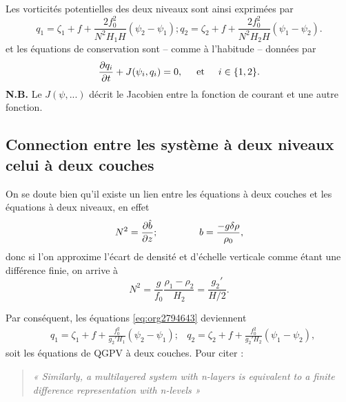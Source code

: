 \documentclass[10pt]{report}
\numberwithin{equation}{section}
\begin{document}
Les vorticités potentielles des deux niveaux sont ainsi exprimées par
\begin{subequations}
\label{eq:org2794643}
\begin{equation}
q_1 = \zeta_1 + f + \frac{2 f_0^2}{N^2 H_1 H} (\psi_2 - \psi_1);
\end{equation}
\begin{equation}
q_2 = \zeta_2 + f + \frac{2 f_0^2}{N^2 H_2 H} (\psi_1 - \psi_2).
\end{equation}
\end{subequations}
et les équations de conservation sont -- comme à l'habitude -- données par
\begin{equation}
\pdv{q_i}{t} + J (\psi_i,q_i) = 0,
\hspace{0.5cm} \text{et} \hspace{0.5cm}
i \in \qty{1,2}.
\end{equation}
\textbf{N.B.} Le \(J(\psi,...)\) décrit le Jacobien entre la fonction de courant et une autre fonction.
\vspace{2cm}

\subsection{Connection entre les système à \textbf{deux niveaux} celui à \textbf{deux couches}}
\label{sec:org340630e}
On se doute bien qu'il existe un lien entre les équations à deux couches et les équations à deux niveaux, en effet
\begin{equation}  
N^2 = \pdv{\hat{b}}{z}; \hspace{1.5cm} b = \frac{-g\delta \rho}{\rho_0},
\end{equation}
donc si l'on approxime l'écart de densité et d'échelle verticale comme étant une différence finie, on arrive à
\begin{equation}
N^2 = \frac{g}{f_0} \frac{\rho_1 - \rho_2}{H_2} = \frac{g_2'}{H/2}.
\end{equation}

Par conséquent, les équations \ref{eq:org2794643} deviennent
\begin{align}
&q_1 = \zeta_1 + f + \frac{f_0^2}{g_2' H_1} (\psi_2 - \psi_1);
&q_2 = \zeta_2 + f + \frac{f_0^2}{g_2' H_2} (\psi_1 - \psi_2),
\end{align}
soit les équations de QGPV à deux couches.
Pour citer \autocite[p.195]{vallis_2006} :
\begin{quote}
\textit{« Similarly, a multilayered system with n-layers is equivalent to a finite difference representation with n-levels »}
\end{quote}
\end{document}
